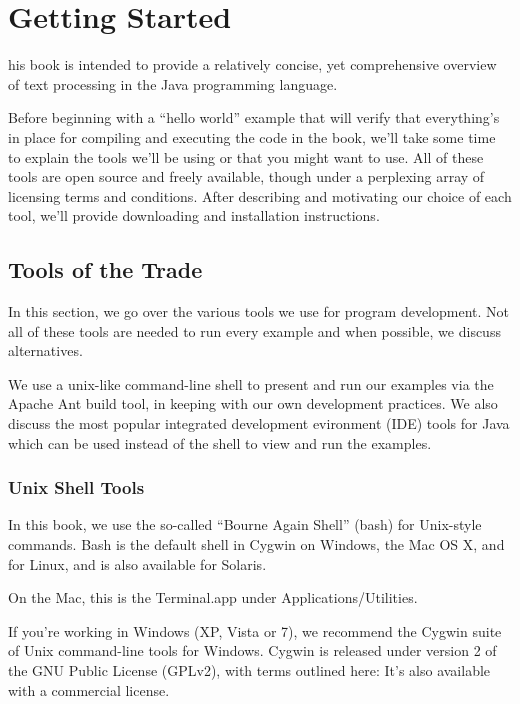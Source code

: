 \chapter{Getting Started}

his book is intended to provide a relatively concise,
yet comprehensive overview of text processing in the Java programming
language.  

Before beginning with a ``hello world'' example that will verify that
everything's in place for compiling and executing the code in the
book, we'll take some time to explain the tools we'll be using or that
you might want to use.  All of these tools are open source and freely
available, though under a perplexing array of licensing terms and
conditions.  After describing and motivating our choice of each tool,
we'll provide downloading and installation instructions.

\section{Tools of the Trade}

In this section, we go over the various tools we use for program
development.  Not all of these tools are needed to run every example
and when possible, we discuss alternatives.

We use a unix-like command-line shell to present and run our examples
via the Apache Ant build tool, in keeping with our own development
practices.  We also discuss the most popular integrated
development evironment (IDE) tools for Java which can be used
instead of the shell to view and run the examples.

\subsection{Unix Shell Tools}

In this book, we use the so-called ``Bourne Again Shell'' (bash) for
Unix-style commands.  Bash is the default shell in Cygwin on Windows,
the Mac OS X, and for Linux, and is also available for Solaris.

On the Mac, this is the Terminal.app under Applications/Utilities.

If you're working in Windows (XP, Vista or 7), we recommend the 
Cygwin suite of Unix command-line tools for Windows.  
Cygwin is released under version 2 of the GNU Public License (GPLv2), with
terms outlined here:
%
%
It's also available with a commercial license.

